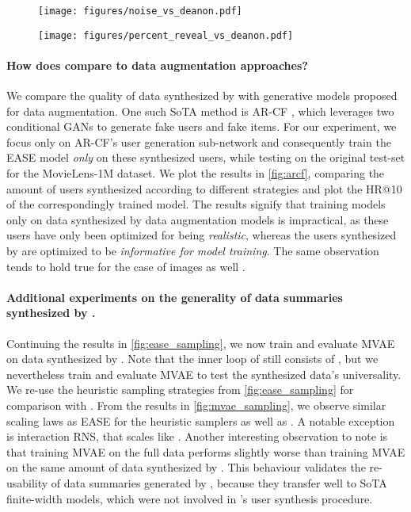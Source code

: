 \documentclass{article}
\begin{document}
\begin{figure}
\centering
\begin{minipage}{.48\textwidth}
  \centering
  \texttt{[image: figures/noise\_vs\_deanon.pdf]}
  \label{fig:deanon_noise}
\end{minipage} \hfill
\begin{minipage}{.48\textwidth}
  \centering
  \texttt{[image: figures/percent\_reveal\_vs\_deanon.pdf]}
  \label{fig:deanon_data_reveal}
\end{minipage}
\end{figure}

\paragraph{How does \sampler compare to data augmentation approaches?} 
We compare the quality of data synthesized by \sampler with generative models proposed for data augmentation. One such SoTA method is AR-CF \cite{arcf}, which leverages two conditional GANs \cite{cgan} to generate fake users and fake items. For our experiment, we focus only on AR-CF's user generation sub-network and consequently train the EASE \cite{ease} model \emph{only} on these synthesized users, while testing on the original test-set for the MovieLens-1M dataset. We plot the results in \cref{fig:arcf}, comparing the amount of users synthesized according to different strategies and plot the HR@10 of the correspondingly trained model. The results signify that training models only on data synthesized by data augmentation models is impractical, as these users have only been optimized for being \emph{realistic}, whereas the users synthesized by \sampler are optimized to be \emph{informative for model training}. The same observation tends to hold true for the case of images as well \cite{zhao_dc}.

\paragraph{Additional experiments on the generality of data summaries synthesized by \sampler.} Continuing the results in \cref{fig:ease_sampling}, we now train and evaluate MVAE \cite{mvae} on data synthesized by \sampler. Note that the inner loop of \sampler still consists of \model, but we nevertheless train and evaluate MVAE to test the synthesized data's universality. We re-use the heuristic sampling strategies from \cref{fig:ease_sampling} for comparison with \sampler. From the results in \cref{fig:mvae_sampling}, we observe similar scaling laws as EASE for the heuristic samplers as well as \sampler. A notable exception is interaction RNS, that scales like \model. Another interesting observation to note is that training MVAE on the full data performs slightly worse than training MVAE on the same amount of data synthesized by \sampler. This behaviour validates the re-usability of data summaries generated by \sampler, because they transfer well to SoTA finite-width models, which were not involved in \sampler's user synthesis procedure.
\end{document}

